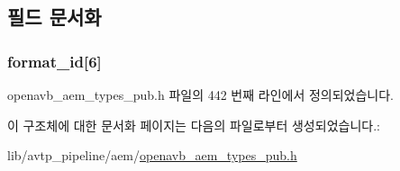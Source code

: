 \subsection{필드 문서화}
\subsubsection[{\texorpdfstring{format\+\_\+id}{format_id}}]{ format\+\_\+id\mbox{[}6\mbox{]}}\hypertarget{structopenavb__aem__stream__format__vendor__t_ae1ff7c8bfecfa86c9ab47966bf21d53e}{}\label{structopenavb__aem__stream__format__vendor__t_ae1ff7c8bfecfa86c9ab47966bf21d53e}


openavb\+\_\+aem\+\_\+types\+\_\+pub.\+h 파일의 442 번째 라인에서 정의되었습니다.



이 구조체에 대한 문서화 페이지는 다음의 파일로부터 생성되었습니다.\+:\begin{DoxyCompactItemize}
\item 
lib/avtp\+\_\+pipeline/aem/\hyperlink{openavb__aem__types__pub_8h}{openavb\+\_\+aem\+\_\+types\+\_\+pub.\+h}\end{DoxyCompactItemize}
